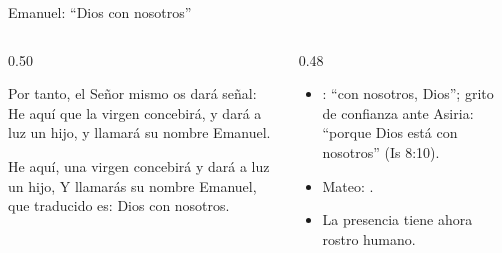 \begin{frame}{Emanuel: ``Dios con nosotros''}
\begin{columns}[t,onlytextwidth]
\begin{column}{0.50\textwidth}
\begin{cita}[fontupper=\scriptsize\itshape]Por tanto, el Señor mismo os dará señal: He aquí que la virgen concebirá, y dará a luz un hijo, y llamará su nombre Emanuel.\end{cita}
\begin{cita}[fontupper=\scriptsize\itshape]He aquí, una virgen concebirá y dará a luz un hijo, Y llamarás su nombre Emanuel, que traducido es: Dios con nosotros.\end{cita}
\end{column}
\begin{column}{0.48\textwidth}\small
\begin{itemize}
\item {}: ``con nosotros, Dios''; grito de confianza ante Asiria: ``porque Dios está con nosotros'' (Is 8:10).
\item Mateo: .
\item La presencia tiene ahora rostro humano.
\end{itemize}
\end{column}
\end{columns}
\end{frame}

